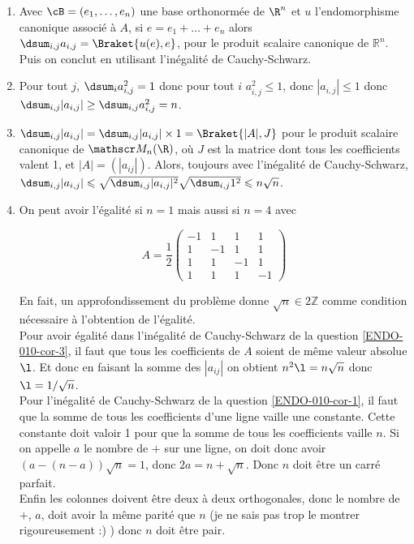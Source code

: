 \begin{enumerate}
  \item\label{ENDO-010-cor-1} Avec $\cB=(e_1,\dots,e_n)$ une base orthonormée de $\R^n$ et $u$ l'endomorphisme canonique associé à $A$, si $e = e_1+\dots+e_n$ alors $\dsum_{i,j} a_{i,j} = \Braket{u(e),e}$, pour le produit scalaire canonique de $\mathbb R^n$. Puis on conclut en utilisant l'inégalité de Cauchy-Schwarz.
  \item Pour tout $j$, $\dsum_i a_{i,j}^2 = 1$ donc pour tout $i$ $a_{i,j}^2 \leqslant 1$, donc
$|a_{i,j}| \leqslant 1$ donc $\dsum_{i,j} |a_{i,j}| \geq \dsum_{i,j} a_{i,j}^2 = n$.
  \item\label{ENDO-010-cor-3} $\dsum_{i,j} |a_{i,j}|=\dsum_{i,j} |a_{i,j}|\times 1=\Braket{|A|,J}$ pour le produit scalaire canonique de $\mathscr M_n(\R)$, où $J$ est la matrice dont tous les coefficients valent 1, et $|A|=(|a_{ij}|)$. Alors, toujours avec l'inégalité de Cauchy-Schwarz, $\dsum_{i,j} |a_{i,j}|  \leqslant \sqrt{\dsum_{i,j} |a_{i,j}|^2} \sqrt{\dsum_{i,j} 1^2} \leqslant n\sqrt{n}$.
  \item On peut avoir l'égalité si $n=1$ mais aussi si $n=4$ avec

$$
A=\frac{1}{2}\left(\begin{array}{cccc}
-1 & 1 & 1 & 1 \\
1 & -1 & 1 & 1 \\
1 & 1 & -1 & 1 \\
1 & 1 & 1 & -1
\end{array}\right)
$$


En fait, un approfondissement du problème donne $\sqrt{n} \in 2 \mathbb{Z}$ comme condition nécessaire à l'obtention de l'égalité.\\
Pour avoir égalité dans l'inégalité de Cauchy-Schwarz de la question \ref{ENDO-010-cor-3}, il faut que tous les coefficients de $A$ soient de même valeur absolue $\l$. Et donc en faisant la somme des $|a_{ij}|$ on obtient $n^2\l=n\sqrt n$ donc $\l=1/\sqrt n$.\\
Pour l'inégalité de Cauchy-Schwarz de la question \ref{ENDO-010-cor-1}, il faut que la somme de tous les coefficients d'une ligne vaille une constante. Cette constante doit valoir 1 pour que la somme de tous les coefficients vaille $n$. Si on appelle $a$ le nombre de $+$ sur une ligne, on doit donc avoir $(a-(n-a))\sqrt n=1$, donc $2a=n+\sqrt n$. Donc $n$ doit être un carré parfait.\\
Enfin les colonnes doivent être deux à deux orthogonales, donc le nombre de $+$, $a$, doit avoir la même parité que $n$ (je ne sais pas trop le montrer rigoureusement :) ) donc $n$ doit être pair.
\end{enumerate}
